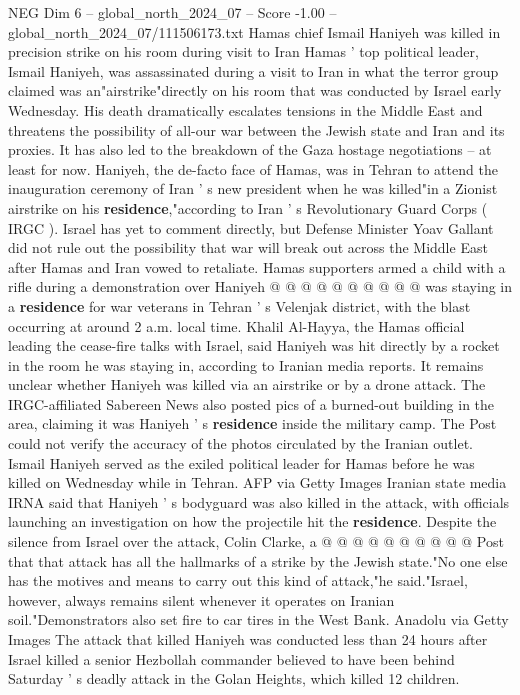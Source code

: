 \begin{textsample}{NEG Dim 6 – global\_north\_2024\_07 – Score -1.00 – global\_north\_2024\_07/111506173.txt}  \label{ex:f6_neg_223}
Hamas chief Ismail Haniyeh was killed in precision strike on his room during visit to Iran Hamas ' top political leader, Ismail Haniyeh, was assassinated during a visit to Iran in what the terror group claimed was an"airstrike"directly on his room that was conducted by Israel early Wednesday.
His death dramatically escalates tensions in the Middle East and threatens the possibility of all-our war between the Jewish state and Iran and its proxies.
It has also led to the breakdown of the Gaza hostage negotiations -- at least for now.
Haniyeh, the de-facto face of Hamas, was in Tehran to attend the inauguration ceremony of Iran ' s new president when he was killed"in a Zionist airstrike on his \textbf{residence},"according to Iran ' s Revolutionary Guard Corps ( IRGC ).
Israel has yet to comment directly, but Defense Minister Yoav Gallant did not rule out the possibility that war will break out across the Middle East after Hamas and Iran vowed to retaliate.
Hamas supporters armed a child with a rifle during a demonstration over Haniyeh @ @ @ @ @ @ @ @ @ @ was staying in a \textbf{residence} for war veterans in Tehran ' s Velenjak district, with the blast occurring at around 2 a.m. local time.
Khalil Al-Hayya, the Hamas official leading the cease-fire talks with Israel, said Haniyeh was hit directly by a rocket in the room he was staying in, according to Iranian media reports.
It remains unclear whether Haniyeh was killed via an airstrike or by a drone attack.
The IRGC-affiliated Sabereen News also posted pics of a burned-out building in the area, claiming it was Haniyeh ' s \textbf{residence} inside the military camp.
The Post could not verify the accuracy of the photos circulated by the Iranian outlet.
Ismail Haniyeh served as the exiled political leader for Hamas before he was killed on Wednesday while in Tehran.
AFP via Getty Images Iranian state media IRNA said that Haniyeh ' s bodyguard was also killed in the attack, with officials launching an investigation on how the projectile hit the \textbf{residence}.
Despite the silence from Israel over the attack, Colin Clarke, a @ @ @ @ @ @ @ @ @ @ Post that that attack has all the hallmarks of a strike by the Jewish state."No one else has the motives and means to carry out this kind of attack,"he said."Israel, however, always remains silent whenever it operates on Iranian soil."Demonstrators also set fire to car tires in the West Bank.
Anadolu via Getty Images The attack that killed Haniyeh was conducted less than 24 hours after Israel killed a senior Hezbollah commander believed to have been behind Saturday ' s deadly attack in the Golan Heights, which killed 12 children.

\end{textsample}

